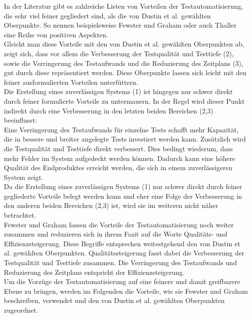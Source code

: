 In der Literatur gibt es zahlreiche Listen von Vorteilen der Testautomatisierung, die sehr viel feiner gegliedert sind, als die von Dustin et al. \cite[S.44 ff.]{dustin_software_2001} gewählten Oberpunkte.
So nennen beispielsweise Fewster und Graham \cite[vgl. S.9 ff.]{fewster_software_1999} oder auch Thaller \cite[vgl. S.28 ff.]{thaller_software-test_2002} eine Reihe von positiven Aspekten.\\
Gleicht man diese Vorteile mit den von Dustin et al. gewählten Oberpunkten ab, zeigt sich, dass vor allem die Verbesserung der Testqualität und Testtiefe (2), sowie die Verringerung des Testaufwands und die Reduzierung des Zeitplans (3), gut durch diese repräsentiert werden. Diese Oberpunkte lassen sich leicht mit den feiner ausformulierten Vorteilen unterfüttern.\\ Die Erstellung eines zuverlässigen Systems (1) ist hingegen nur schwer direkt durch feiner formulierte Vorteile zu untermauern. In der Regel wird dieser Punkt indirekt durch eine Verbesserung in den letzten beiden Bereichen (2,3) beeinflusst:\\
Eine Verringerung des Testaufwands für einzelne Tests schafft mehr Kapazität, die in bessere und breiter angelegte Tests investiert werden kann. Zusätzlich wird die Testqualität und Testtiefe direkt verbessert. Dies bedingt wiederum, dass mehr Fehler im System aufgedeckt werden können. Dadurch kann eine höhere Qualität des Endproduktes erreicht werden, die sich in einem zuverlässigeren System zeigt.\\
Da die Erstellung eines zuverlässigen Systems (1) nur schwer direkt durch feiner gegliederte Vorteile belegt werden kann und eher eine Folge der Verbesserung in den anderen beiden Bereichen (2,3) ist, wird sie im weiteren nicht näher betrachtet.\\
Fewster und Graham \cite[vgl. S.10]{fewster_software_1999} fassen die Vorteile der Testautomatisierung noch weiter zusammen und reduzieren sich in ihrem Fazit auf die Worte \grq Qualitäts- und Effizienzsteigerung\grq.
Diese Begriffe entsprechen weitestgehend den von Dustin et al. gewählten Oberpunkten. Qualitätssteigerung fasst dabei die Verbesserung der Testqualität und Testtiefe zusammen. Die Verringerung des Testaufwands und Reduzierung des Zeitplans entspricht der Effizienzsteigerung.\\
Um die Vorzüge der Testautomatisierung auf eine feinere und damit greifbarere Ebene zu bringen, werden im Folgenden die Vorteile, wie sie 
Fewster und Graham beschreiben, verwendet und den von Dustin et al. gewählten Oberpunkten zugeordnet.

